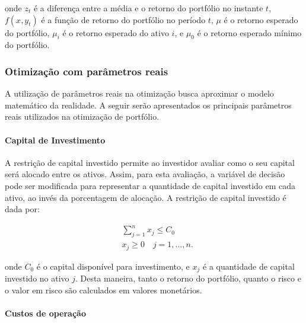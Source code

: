                     \noindent onde $z_{t}$ é a diferença entre a média e o retorno do portfólio no instante $t$, $f(x,y_{t})$ é a função de retorno do portfólio no período $t$, $\mu$ é o retorno esperado do portfólio, $\mu_{i}$ é o retorno esperado do ativo $i$, e $\mu_0$ é o retorno esperado mínimo do portfólio.

            \subsubsection{Otimização com parâmetros reais}

                \ipar A utilização de parâmetros reais na otimização busca aproximar o modelo matemático da realidade. A seguir serão apresentados os principais parâmetros reais utilizados na otimização de portfólio.

                \paragraph{Capital de Investimento}
                
                    \ipar A restrição de capital investido permite ao investidor avaliar como o seu capital será alocado entre os ativos. Assim, para esta avaliação, a variável de decisão pode ser modificada para representar a quantidade de capital investido em cada ativo, ao invés da porcentagem de alocação. A restrição de capital investido é dada por:

                    \begin{equation}
                        \begin{aligned}
                            & \sum_{j=1}^{n} x_{j} \leq C_{0} \\
                            & x_{j} \geq 0 \quad j=1, \ldots, n \text{.}
                        \end{aligned}
                    \end{equation}

                    \noindent onde $C_{0}$ é o capital disponível para investimento, e $x_{j}$ é a quantidade de capital investido no ativo $j$. Desta maneira, tanto o retorno do portfólio, quanto o risco e o valor em risco são calculados em valores monetários.
                    
                \paragraph{Custos de operação}

